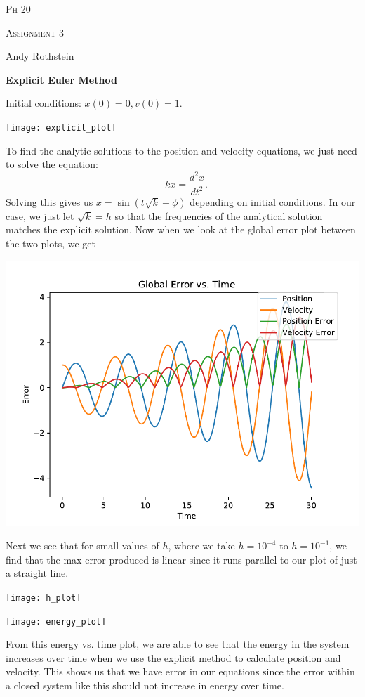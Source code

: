 \documentclass[10pt]{report}
\begin{document}
\begin{center}\textsc{\Large Ph 20}

\textsc{\large Assignment 3}

\end{center}
Andy Rothstein

\bigskip

\noindent\textbf{Explicit Euler Method}

Initial conditions: $x(0)=0, v(0)=1$.

\texttt{[image: explicit\_plot]}

To find the analytic solutions to the position and velocity equations, we just need to solve the equation:
$$-kx=\frac{d^2x}{dt^2}.$$
Solving this gives us $x=\sin(t\sqrt k+\phi)$ depending on initial conditions. In our case, we just let $\sqrt k=h$ so that the frequencies of the analytical solution matches the explicit solution. Now when we look at the global error plot between the two plots, we get

\includegraphics[scale = .85]{error_plot}

Next we see that for small values of $h$, where we take $h=10^{-4}$ to $h=10^{-1}$, we find that the max error produced is linear since it runs parallel to our plot of just a straight line. 

\texttt{[image: h\_plot]}

\texttt{[image: energy\_plot]}

From this  energy vs. time plot, we are able to see that the energy in the system increases over time when we use the explicit method to calculate position and velocity. This shows us that we have error in our equations since the error within a closed system like this should not increase in energy over time. 
\end{document}
